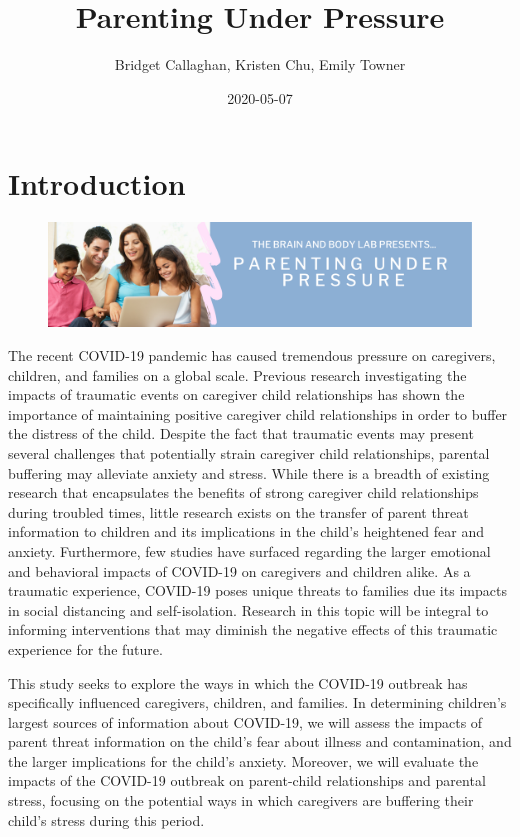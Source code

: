 \documentclass[]{book}
\title{Parenting Under Pressure}
\author{Bridget Callaghan, Kristen Chu, Emily Towner}
\date{2020-05-07}
\begin{document}
\maketitle

{
\setcounter{tocdepth}{1}
\tableofcontents
}
\hypertarget{introduction}{%
\chapter{Introduction}\label{introduction}}

\begin{figure}
\centering
\includegraphics{images/pup_header.png}
\caption{}
\end{figure}

The recent COVID-19 pandemic has caused tremendous pressure on caregivers, children, and families on a global scale. Previous research investigating the impacts of traumatic events on caregiver child relationships has shown the importance of maintaining positive caregiver child relationships in order to buffer the distress of the child. Despite the fact that traumatic events may present several challenges that potentially strain caregiver child relationships, parental buffering may alleviate anxiety and stress. While there is a breadth of existing research that encapsulates the benefits of strong caregiver child relationships during troubled times, little research exists on the transfer of parent threat information to children and its implications in the child's heightened fear and anxiety. Furthermore, few studies have surfaced regarding the larger emotional and behavioral impacts of COVID-19 on caregivers and children alike. As a traumatic experience, COVID-19 poses unique threats to families due its impacts in social distancing and self-isolation. Research in this topic will be integral to informing interventions that may diminish the negative effects of this traumatic experience for the future.

This study seeks to explore the ways in which the COVID-19 outbreak has specifically influenced caregivers, children, and families. In determining children's largest sources of information about COVID-19, we will assess the impacts of parent threat information on the child's fear about illness and contamination, and the larger implications for the child's anxiety. Moreover, we will evaluate the impacts of the COVID-19 outbreak on parent-child relationships and parental stress, focusing on the potential ways in which caregivers are buffering their child's stress during this period.
\end{document}
